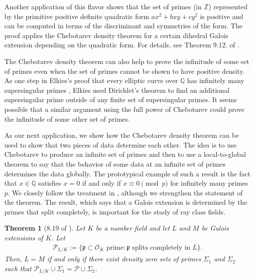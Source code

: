 \documentclass[12pt]{amsart}
\newtheorem{thm}{Theorem}[section]
\theoremstyle{definition}
\theoremstyle{remark}
\numberwithin{equation}{section}
\newcommand{\cO}{\mathcal O}
\newcommand{\cP}{\mathcal P}
\newcommand{\fkp}{\mathfrak p}
\newcommand{\bbQ}{\mathbb Q}
\newcommand{\bbZ}{\mathbb Z}
\begin{document}
Another application of this flavor shows that the set of primes (in $\bbZ$) represented by the primitive positive definite quadratic form $ax^2 + bxy + cy^2$ is positive and can be computed in terms of the discriminant and symmetries of the form. The proof applies the Chebotarev density theorem for a certain dihedral Galois extension depending on the quadratic form. For details, see Theorem 9.12. of \cite{CoxPrimes}.

The Chebotarev density theorem can also help to prove the infinitude of some set of primes even when the set of primes cannot be shown to have positive density. As one step in Elkies's proof that every elliptic curve over $\bbQ$ has infinitely many supersingular primes \cite{Elkies87}, Elkies used Dirichlet's theorem to find an additional supersingular prime outside of any finite set of supersingular primes. It seems possible that a similar argument using the full power of Chebotarev could prove the infinitude of some other set of primes.

As our next application, we show how the Chebotarev density theorem can be used to show that two pieces of data determine each other. The idea is to use Chebotarev to produce an infinite set of primes and then to use a local-to-global theorem to say that the behavior of some data at an infinite set of primes determines the data globally. The prototypical example of such a result is the fact that $x \in \bbQ$ satisfies $x = 0$ if and only if $x \equiv 0 \pmod{p}$ for infinitely many primes $p$. We closely follow the treatment in \cite{CoxPrimes}, although we strengthen the statement of the theorem. The result, which says that a Galois extension is determined by the primes that split completely, is important for the study of ray class fields.

\begin{thm}[8.19 of \cite{CoxPrimes}]
Let $K$ be a number field and let $L$ and $M$ be Galois extensions of $K$. Let 
\begin{align*}
\cP_{L/K} := \{\fkp \subset \cO_{K} \text{ prime}: \fkp \text{ splits completely in } L\}.
\end{align*}
Then, $L = M$ if and only if there exist density zero sets of primes $\Sigma_1$ and $\Sigma_2$ such that $\cP_{L/K} \cup \Sigma_1 = \cP\cup \Sigma_2$.
\end{thm}
\end{document}
